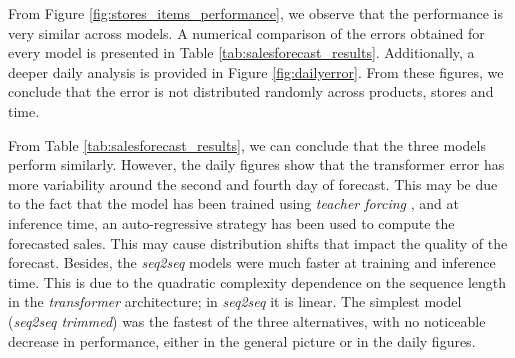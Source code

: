 From Figure \ref{fig:stores_items_performance}, we observe that the performance is very similar across models. A numerical comparison of the errors obtained for every model is presented in Table \ref{tab:salesforecast_results}. Additionally, a deeper daily analysis is provided in Figure \ref{fig:dailyerror}. From these figures, we conclude that the error is not distributed randomly across products, stores and time.

From Table \ref{tab:salesforecast_results}, we can conclude that the three models perform similarly. However, the daily figures show that the transformer error has more variability around the second and fourth day of forecast. This may be due to the fact that the model has been trained using \textit{teacher forcing} \autocite{williams1989, goyal2016}, and at inference time, an auto-regressive strategy has been used to compute the forecasted sales. This may cause distribution shifts that impact the quality of the forecast.  Besides, the \textit{seq2seq} models were much faster at training and inference time. This is due to the quadratic complexity dependence on the sequence length in the \textit{transformer} architecture; in \textit{seq2seq} it is linear. The simplest model (\textit{seq2seq trimmed}) was the fastest of the three alternatives, with no noticeable decrease in performance, either in the general picture or in the daily figures.

